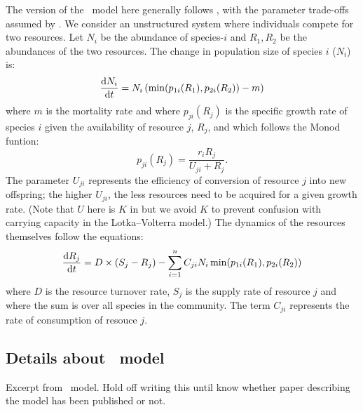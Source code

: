\documentclass[a4paper,11pt]{article}
\begin{document}
The version of the \Rstar\ model here generally follows
\citet{Huisman-2001}, with the parameter trade-offs assumed by
\citet{Fox-2008}.
%
We consider an unstructured system where individuals compete for two
resources. Let $N_i$ be the abundance of species-$i$ and $R_1, R_2$ be
the abundances of the two resources.
%
The change in population size of species $i$ ($N_i$) is:
\begin{equation}
  \label{eq:rstar-n}
  \frac{\mathrm{d} N_i}{\mathrm{d} t} = N_i \, (\min(p_{1i}(R_1), p_{2i}(R_2)) - m)
\end{equation}
where $m$ is the mortality rate and where $p_{ji}(R_j)$ is the
specific growth rate of species $i$ given the availability of resource
$j$, $R_j$, and which follows the Monod funtion:
\begin{equation}
  \label{eq:rstar-p}
  p_{ji}(R_j) = \frac{r_i R_j}{U_{ji} + R_j}.
\end{equation}
%
The parameter $U_{ji}$ represents the efficiency of conversion of
resource $j$ into new offspring; the higher $U_{ji}$, the less
resources need to be acquired for a given growth rate.  (Note that $U$
here is $K$ in \citealt{Huisman-2001} but we avoid $K$ to prevent
confusion with carrying capacity in the Lotka--Volterra model.)
%
The dynamics of the resources themselves follow the equations:
\begin{equation}
  \label{eq:rstar-r}
  \frac{\mathrm{d} R_j}{\mathrm{d} t} =
  D \times (S_j - R_j) - \sum_{i=1}^n {C_{ji} N_i
    \min(p_{1i}(R_1), p_{2i}(R_2))}
\end{equation}
where $D$ is the resource turnover rate, $S_j$ is the supply rate of
resource $j$ and where the sum is over all species in the community.
The term $C_{ji}$ represents the rate of consumption of resouce $j$.


\subsection{Details about \plant\ model}\label{sec:plant}

Excerpt from  \plant\ model. Hold off writing this until know whether paper describing
the model has been published or not.
\end{document}
